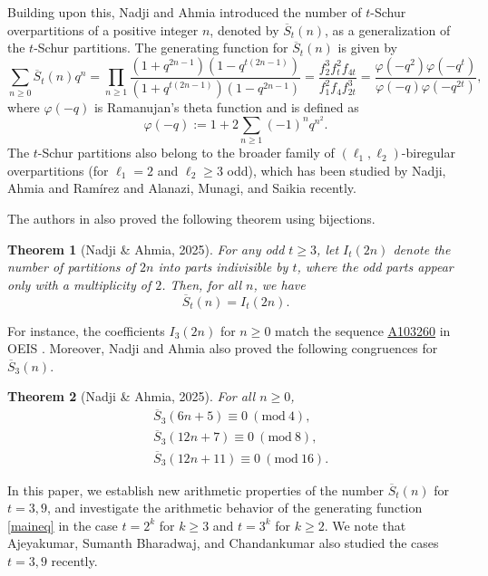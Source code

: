 \documentclass[12pt]{amsart}
\newcommand{\seqnum}[1]{\href{http://oeis.org/#1}{\underline{#1}}}
\theoremstyle{plain}
\newtheorem{theorem}{Theorem}[section]
\theoremstyle{definition}
\begin{document}
Building upon this, Nadji and Ahmia \cite{NadjiAhmia2024} introduced the number of $t$-Schur overpartitions of a positive integer $n$, denoted by $\overline{S}_{t}(n)$, as a generalization of the $t$-Schur partitions. The generating function for $\overline{S}_{t}(n)$ is given by
\begin{equation}
 \sum_{n\geq 0} \overline{S}_{t}(n)q^{n}=\prod_{n\geq 1}\dfrac{(1+q^{2n-1})(1-q^{t(2n-1)})}{(1+q^{t(2n-1)})(1-q^{2n-1})}=\dfrac{f_{2}^{3}f_{t}^{2}f_{4t}}{f_{1}^{2}f_{4}f_{2t}^{3}}=\frac{\varphi(-q^2)\varphi(-q^t)}{\varphi(-q)\varphi(-q^{2t})},  \label{maineq}
\end{equation}
where $\varphi(-q)$ is Ramanujan's theta function and is defined as 
\[
\varphi(-q):=1+2\sum_{n\geq 1}(-1)^nq^{n^2}.\] The $t$-Schur partitions also belong to the broader family of $(\ell_{1}, \ell_{2})$-biregular overpartitions (for $\ell_{1}=2$ and $\ell_{2}\geq 3$ odd), which has been studied by Nadji, Ahmia and Ramírez \cite{NAR2025} and Alanazi, Munagi, and Saikia \cite{AMS2025} recently.

The authors in \cite{NadjiAhmia2024} also proved the following theorem using bijections.
\begin{theorem}[Nadji \& Ahmia, 2025]
For any odd  $t\geq 3$, let $I_{t}(2n)$ denote the number of partitions of $2n$ into parts indivisible by $t$, where the odd parts appear only with a multiplicity of $2$. Then, for all $n$, we have
\[
\overline{S}_{t}(n)=I_{t}(2n).
\]
\end{theorem}
\noindent For instance, the coefficients $I_{3}(2n)$ for $n\geq 0$ match the sequence \seqnum{A103260} in OEIS \cite{OEIS}. Moreover, Nadji and Ahmia \cite{NadjiAhmia2024} also proved the following congruences for $\overline{S}_{3}(n)$.
\begin{theorem}[Nadji \& Ahmia, 2025] For all $n\geq 0$,
\begin{align*}
&\overline{S}_{3}(6n+5) \equiv  0 \ (\mathrm{mod} \ 4),\\
&\overline{S}_{3}(12n+7) \equiv 0 \ (\mathrm{mod} \ 8),\\
&\overline{S}_{3}(12n+11) \equiv 0 \ (\mathrm{mod} \ 16).
\end{align*}
\end{theorem}

In this paper, we establish new arithmetic properties of the number $\overline{S}_{t}(n)$ for $t=3,9$, and investigate the arithmetic behavior of the generating function \eqref{maineq} in the case $t=2^k$ for $k\geq 3$ and $t=3^k$ for $k\geq 2$. We note that Ajeyakumar, Sumanth Bharadwaj, and Chandankumar \cite{arxiv} also studied the cases $t=3,9$ recently.
 
\end{document}
